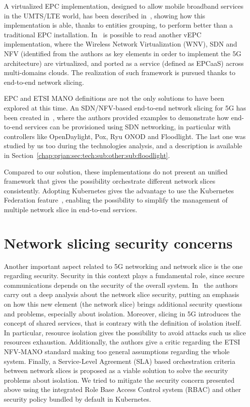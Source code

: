 A virtualized EPC implementation, designed to allow mobile broadband services in
the UMTS/LTE world, has been described in~\cite{hawilo2014nfv}, showing how this
implementation is able, thanks to entities grouping, to perform better than a
traditional EPC installation. In~\cite{afolabi2017end} is possible to read
another vEPC implementation, where the Wireless Network Virtualization (WNV),
SDN and NFV (identified from the authors as key elements in order to implement
the 5G architecture) are virtualized, and ported as a service (defined as
EPCaaS) across multi-domains clouds. The realization of such framework is
pursued thanks to end-to-end network slicing.

EPC and ETSI MANO definitions are not the only solutions to have been explored
at this time. An SDN/NFV-based end-to-end network slicing for 5G has been
created in~\cite{chartsias2017sdn}, where the authors provided examples to
demonstrate how end-to-end services can be provisioned using SDN networking, in
particular with controllers like OpenDaylight, Pox, Ryu ONOD and Floodlight. The
last one was studied by us too during the technologies analysis, and a
description is available in
Section~\ref{chap:prjan:sec:tech:sub:other:sub:floodlight}.

Compared to our solution, these implementations do not present an unified
framework that gives the possibility orchestrate different network slices
consistently. Adopting Kubernetes gives the advantage to use the Kubernetes
Federation feature~\cite{kubeFederation}, enabling the possibility to simplify
the management of multiple network slice in end-to-end services.

\section{Network slicing security concerns}

Another important aspect related to 5G networking and network slice is the one
regarding security. Security in this context plays a fundamental role, since
secure communications depends on the security of the overall system.
In~\cite{kotulski2017end} the authors carry out a deep analysis about the
network slice security, putting an emphasis on how this new element (the network
slice) brings additional security questions and problems, especially about
isolation. Moreover, slicing in 5G introduces the concept of shared services,
that is contrary with the definition of isolation itself. In particular,
resource isolation gives the possibility to avoid attacks such us slice
resources exhaustion. Additionally, the authors give a critic regarding the ETSI
NFV-MANO standard making too general assumptions regarding the whole system.
Finally, a Service-Level Agreement (SLA) based orchestration criteria between
network slices is proposed as a viable solution to solve the security problems
about isolation. We tried to mitigate the security concern presented above using
the integrated Role Base Access Control system (RBAC) and other security policy
bundled by default in Kubernetes.

